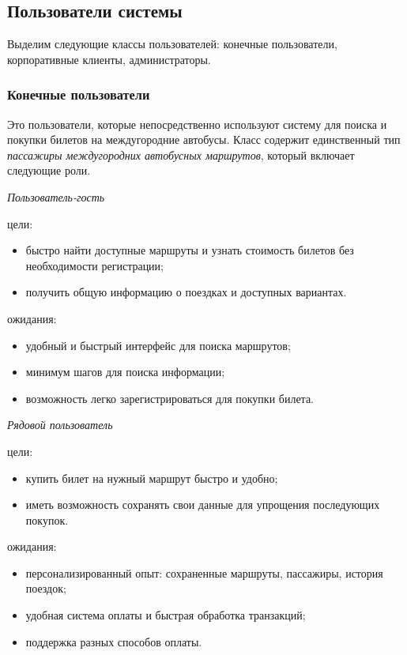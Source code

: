 \subsection{Пользователи системы}

Выделим следующие классы пользователей: конечные пользователи, корпоративные
клиенты, администраторы.

\subsubsection*{Конечные пользователи}

Это пользователи, которые непосредственно используют систему для поиска и
покупки билетов на междугородние автобусы. Класс содержит единственный тип
\textit{пассажиры междугородних автобусных маршрутов}, который включает
следующие роли.

\null

\noindent\textit{Пользователь-гость}

\noindent цели:
\begin{itemize}
    \item быстро найти доступные маршруты и узнать стоимость билетов без
    необходимости регистрации;
    \item получить общую информацию о поездках и доступных вариантах.
\end{itemize}

\noindent ожидания:
\begin{itemize}
    \item удобный и быстрый интерфейс для поиска маршрутов;
    \item минимум шагов для поиска информации;
    \item возможность легко зарегистрироваться для покупки билета.
\end{itemize}

\null

\noindent\textit{Рядовой пользователь}

\noindent цели:
\begin{itemize}
    \item купить билет на нужный маршрут быстро и удобно;
    \item иметь возможность сохранять свои данные для упрощения
    последующих покупок.
\end{itemize}

\noindent ожидания:
\begin{itemize}
    \item персонализированный опыт: сохраненные маршруты, пассажиры,
    история поездок;
    \item удобная система оплаты и быстрая обработка транзакций;
    \item поддержка разных способов оплаты.
\end{itemize}

